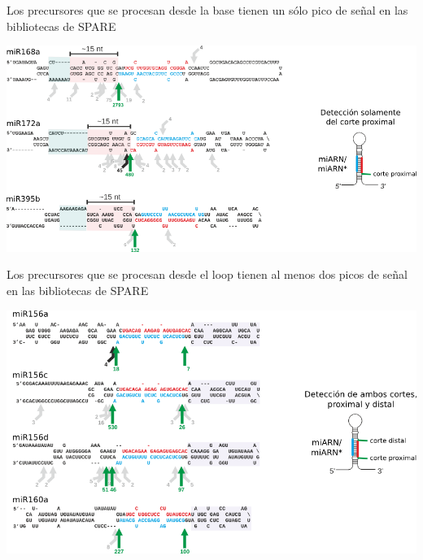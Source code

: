 \documentclass{beamer}
\begin{document}
\begin{frame}{Los precursores que se procesan desde la base tienen un sólo pico de señal en las bibliotecas de SPARE}
	\begin{center}
		\includegraphics[width=1\textwidth]{img/GR_fig2A.png}
	\end{center}
\end{frame}

\begin{frame}{Los precursores que se procesan desde el loop tienen al menos dos picos de señal en las bibliotecas de SPARE}
	\begin{center}
		\includegraphics[width=.9\textwidth]{img/GR_fig4A.png}
	\end{center}
\end{frame}
\end{document}
